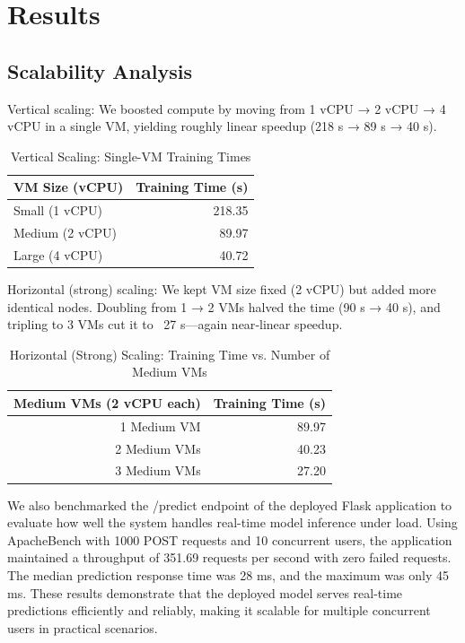 \documentclass[12pt,a4paper]{article}
\begin{document}
\section{Results}
\subsection{Scalability Analysis}
Vertical scaling: We boosted compute by moving from 1 vCPU → 2 vCPU → 4 vCPU in a single VM, yielding roughly linear speedup (218 s → 89 s → 40 s).
\begin{table}[ht]
  \centering
  \caption{Vertical Scaling: Single-VM Training Times}
  \label{tab:vertical_scaling}
  \begin{tabular}{l r}
    \toprule
    \textbf{VM Size (vCPU)} & \textbf{Training Time (s)} \\
    \midrule
    Small (1 vCPU)   & 218.35 \\
    Medium (2 vCPU)  &  89.97 \\
    Large (4 vCPU)   &  40.72 \\
    \bottomrule
  \end{tabular}
\end{table}

Horizontal (strong) scaling: We kept VM size fixed (2 vCPU) but added more identical nodes. Doubling from 1 → 2 VMs halved the time (90 s → 40 s), and tripling to 3 VMs cut it to ~27 s—again near‐linear speedup.

\begin{table}[ht]
  \centering
  \caption{Horizontal (Strong) Scaling: Training Time vs. Number of Medium VMs}
  \label{tab:horizontal_scaling}
  \begin{tabular}{r r}
    \toprule
     \textbf{Medium VMs (2 vCPU each)} & \textbf{Training Time (s)} \\
    \midrule
    1 Medium VM & 89.97 \\
    2 Medium VMs & 40.23 \\
    3 Medium VMs & 27.20 \\
    \bottomrule
  \end{tabular}
\end{table}


We also benchmarked the /predict endpoint of the deployed Flask application to evaluate how well the system handles real-time model inference under load. Using ApacheBench with 1000 POST requests and 10 concurrent users, the application maintained a throughput of 351.69 requests per second with zero failed requests. The median prediction response time was 28 ms, and the maximum was only 45 ms. These results demonstrate that the deployed model serves real-time predictions efficiently and reliably, making it scalable for multiple concurrent users in practical scenarios.
\end{document}
